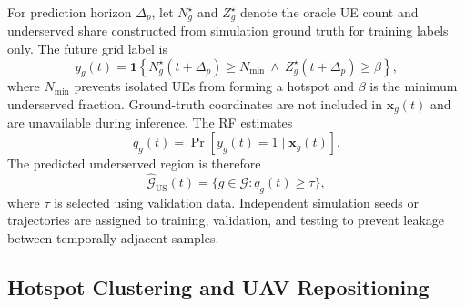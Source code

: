 For prediction horizon $\Delta_p$, let $N_g^\star$ and $Z_g^\star$
denote the oracle UE count and underserved share constructed from
simulation ground truth for training labels only. The future grid label is
\begin{equation}
 y_g(t)=\mathbf{1}\!\left\{
 N_g^\star(t+\Delta_p)\geq N_{\min}\ \land\
 Z_g^\star(t+\Delta_p)\geq\beta
 \right\},
 \label{eq:future-hotspot-label}
\end{equation}
where $N_{\min}$ prevents isolated UEs from forming a hotspot and
$\beta$ is the minimum underserved fraction. Ground-truth coordinates
are not included in $\mathbf{x}_g(t)$ and are unavailable during
inference. The RF estimates
\begin{equation}
 q_g(t)=
 \Pr\!\left[y_g(t)=1\mid\mathbf{x}_g(t)\right].
 \label{eq:rf-output}
\end{equation}
The predicted underserved region is therefore
\begin{equation}
 \widehat{\mathcal{G}}_{\mathrm{US}}(t)=
 \{g\in\mathcal{G}:q_g(t)\geq\tau\},
 \label{eq:predicted-region}
\end{equation}
where $\tau$ is selected using validation data. Independent
simulation seeds or trajectories are assigned to training,
validation, and testing to prevent leakage between temporally
adjacent samples.

\subsection{Hotspot Clustering and UAV Repositioning}

